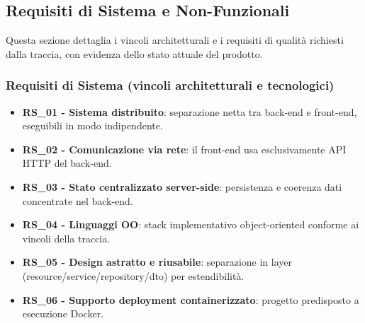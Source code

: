 ﻿\documentclass[11pt,a4paper]{article}
\begin{document}
\subsection{Requisiti di Sistema e Non-Funzionali}
Questa sezione dettaglia i vincoli architetturali e i requisiti di qualità richiesti dalla traccia, con evidenza dello stato attuale del prodotto.

\subsubsection*{Requisiti di Sistema (vincoli architetturali e tecnologici)}
\begin{itemize}
    \item \textbf{RS\_01 - Sistema distribuito}: separazione netta tra back-end e front-end, eseguibili in modo indipendente.
    \item \textbf{RS\_02 - Comunicazione via rete}: il front-end usa esclusivamente API HTTP del back-end.
    \item \textbf{RS\_03 - Stato centralizzato server-side}: persistenza e coerenza dati concentrate nel back-end.
    \item \textbf{RS\_04 - Linguaggi OO}: stack implementativo object-oriented conforme ai vincoli della traccia.
    \item \textbf{RS\_05 - Design astratto e riusabile}: separazione in layer (resource/service/repository/dto) per estendibilità.
    \item \textbf{RS\_06 - Supporto deployment containerizzato}: progetto predisposto a esecuzione Docker.
\end{itemize}
\end{document}
